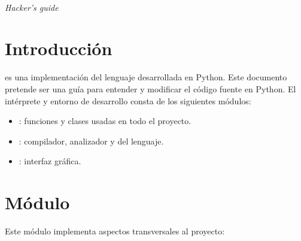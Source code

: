 \documentclass{article}
\begin{document}
\begin{center}
\Large{\PGbs}\\
\vspace{10pt}\large{{\em Hacker's guide}}
\end{center}

\tableofcontents

\section{Introducci\'on}

\PGbs es una implementaci\'on del lenguaje \Gbs desarrollada en Python.
Este documento pretende ser una gu\'ia para entender y modificar
el c\'odigo fuente en Python.
El int\'erprete y entorno de desarrollo \PGbs consta de los siguientes m\'odulos:

\begin{itemize}
\item {}: funciones y clases usadas en todo el proyecto.
\item {}: compilador, analizador y  del lenguaje.
\item {}: interfaz gr\'afica.
\end{itemize}

\section{M\'odulo }

Este m\'odulo implementa aspectos transversales al
proyecto:
\end{document}
